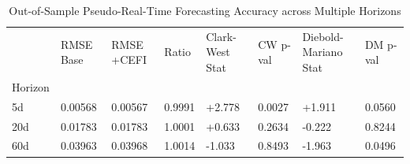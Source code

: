 \begin{table}
\caption{Out-of-Sample Pseudo-Real-Time Forecasting Accuracy across Multiple Horizons}
\label{tab:oos_eval}
\begin{tabular}{llllllll}
\toprule
 & RMSE Base & RMSE +CEFI & Ratio & Clark-West Stat & CW p-val & Diebold-Mariano Stat & DM p-val \\
Horizon &  &  &  &  &  &  &  \\
\midrule
5d & 0.00568 & 0.00567 & 0.9991 & +2.778 & 0.0027 & +1.911 & 0.0560 \\
20d & 0.01783 & 0.01783 & 1.0001 & +0.633 & 0.2634 & -0.222 & 0.8244 \\
60d & 0.03963 & 0.03968 & 1.0014 & -1.033 & 0.8493 & -1.963 & 0.0496 \\
\bottomrule
\end{tabular}
\end{table}
